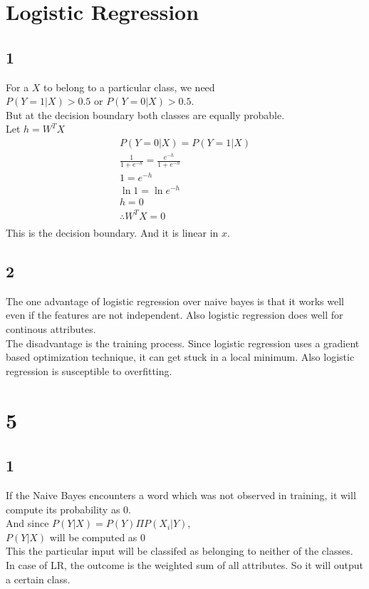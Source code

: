 \documentclass[10pt,a4paper]{article}
\begin{document}
\section{Logistic Regression}
\subsection*{1}
For a $X$ to belong to a particular class, we need \\ $P(Y=1|X)>0.5$ or $P(Y=0|X)>0.5$.\\
But at the decision boundary both classes are equally probable. \\
Let $h=W^{T}X$
\begin{align*}
& P(Y=0|X) = P(Y=1|X) & \\
& \frac{1}{1+e^{-h}} = \frac{e^{-h}}{1+e^{-h}} & \\
& 1=e^{-h}& \\
& \ln{1} = \ln{e^{-h}} & \\
& h = 0 & \\
& \therefore W^{T}X = 0& \\
\end{align*}
This is the decision boundary. And it is linear in $x$.
\subsection*{2}
The one advantage of logistic regression over naive bayes is that it works well even if the features are not independent. Also logistic regression does well for continous attributes.\\
The disadvantage is the training process. Since logistic regression uses a gradient based optimization technique, it can get stuck in a local minimum. Also logistic regression is susceptible to overfitting.
  
\section*{5}
\subsection*{1}
If the Naive Bayes encounters a word which was not observed in training, it will compute its probability as $0$. \\
And since $P(Y|X)=P(Y)\Pi P(X_{i}|Y)$, \\$P(Y|X)$ will be computed as $0$ \\ This the particular input will be classifed as belonging to neither of the classes.\\
In case of LR, the outcome is the weighted sum of all attributes. So it will output a certain class.
\end{document}
